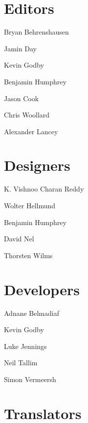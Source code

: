 \section{Editors}

\vspace{-1\baselineskip}
\begin{credits}
  \item Bryan Behrenshausen
  \item Jamin Day
  \item Kevin Godby
  \item Benjamin Humphrey
  \item Jason Cook
  \item Chris Woollard
  \item Alexander Lancey
\end{credits}

\section{Designers}

\vspace{-1\baselineskip}
\begin{credits}
  \item K. Vishnoo Charan Reddy
  \item Wolter Hellmund
  \item Benjamin Humphrey
  \item David Nel
  \item Thorsten Wilms
\end{credits}

\section{Developers}

\vspace{-1\baselineskip}
\begin{credits}
  \item Adnane Belmadiaf
  \item Kevin Godby
  \item Luke Jennings
  \item Neil Tallim
  \item Simon Vermeersh
\end{credits}

\clearpage
\section{Translators}


